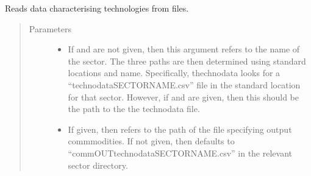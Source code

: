 \documentclass[letterpaper,10pt,english]{sphinxmanual}
\begin{document}
\begin{fulllineitems}
\label{\detokenize{api:muse.readers.csv.read_technologies}}
Reads data characterising technologies from files.
\begin{quote}\begin{description}
\item[{Parameters}] \leavevmode\begin{itemize}
\item {} 
 \textendash{} If  and  are not given,
then this argument refers to the name of the sector. The three paths are
then determined using standard locations and name. Specifically, thechnodata
looks for a “technodataSECTORNAME.csv” file in the standard location for
that sector. However, if   and  are given, then
this should be the path to the the technodata file.

\item {} 
 \textendash{} If given, then refers to the path of the file specifying output
commmodities. If not given, then defaults to
“commOUTtechnodataSECTORNAME.csv” in the relevant sector directory.


\end{itemize}
\end{description}
\end{quote}
\end{fulllineitems}
\end{document}
